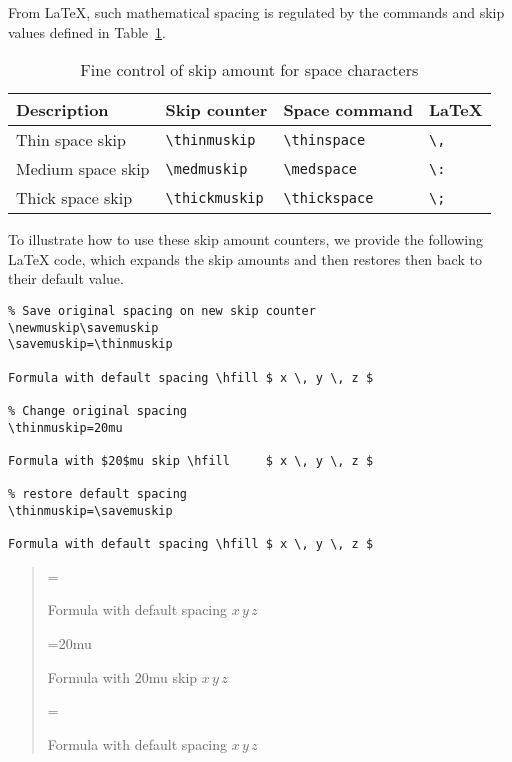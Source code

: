 \documentclass{article}
\def\gives{\endquote\endgroup\egroup}
\begin{document}
From \LaTeX, such mathematical spacing is regulated by the commands and skip values
defined in Table~\ref{tbl:special-other-muskip}.
%
\begin{table}[ht]
\centering
\begin{tabular}{|l|l|l|l|}
   \hline
   \textbf{Description} & \textbf{Skip counter} & \textbf{Space command} & \textbf{\LaTeX} \\
   \hline
   Thin space skip   & \verb|\thinmuskip|  & \verb|\thinspace|  & \verb|\,| \\
   \hline
   Medium space skip & \verb|\medmuskip|   & \verb|\medspace|   & \verb|\:| \\
   \hline
   Thick space skip  & \verb|\thickmuskip| & \verb|\thickspace| & \verb|\;| \\
   \hline
\end{tabular}
\caption{Fine control of skip amount for space characters}\label{tbl:special-other-muskip}
\end{table}
%
To illustrate how to use these skip amount counters, we provide the following
\LaTeX{} code, which expands the skip amounts and then restores then back to
their default value.
%
\begin{demo}
\begin{verbatim}
% Save original spacing on new skip counter
\newmuskip\savemuskip
\savemuskip=\thinmuskip

Formula with default spacing \hfill $ x \, y \, z $

% Change original spacing
\thinmuskip=20mu

Formula with $20$mu skip \hfill     $ x \, y \, z $

% restore default spacing
\thinmuskip=\savemuskip

Formula with default spacing \hfill $ x \, y \, z $
\end{verbatim}
\gives
\begin{quote}
\newmuskip\savemuskip
\savemuskip=\thinmuskip

Formula with default spacing \hfill $ x \, y \, z $

\thinmuskip=20mu

Formula with $20$mu skip \hfill     $ x \, y \, z $

\thinmuskip=\savemuskip

Formula with default spacing \hfill $ x \, y \, z $
\end{quote}
\end{demo}
\end{document}
